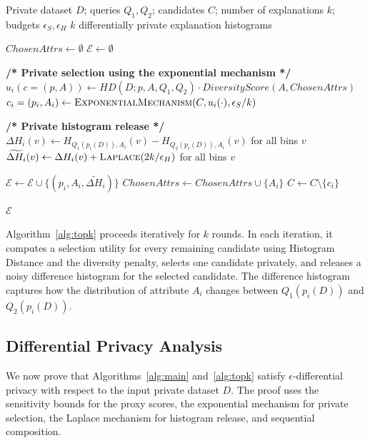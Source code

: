 \begin{algorithm}[t]
\caption{Find-Top-$k$-Explanations}
\label{alg:topk}
\begin{algorithmic}[1]
\Require Private dataset $D$; queries $Q_1,Q_2$; candidates $C$; number of explanations $k$; budgets $\epsilon_S,\epsilon_H$
\Ensure $k$ differentially private explanation histograms

\State $ChosenAttrs \gets \emptyset$
\State $\mathcal{E} \gets \emptyset$

  \State \textbf{/* Private selection using the exponential mechanism */}
  \State $u_i(c=(p,A)) \gets HD(D;p,A,Q_1,Q_2) \cdot DiversityScore(A,ChosenAttrs)$
  \State $c_i=(p_i,A_i) \gets \textsc{ExponentialMechanism}(C,u_i(\cdot),\epsilon_S/k)$

  \State \textbf{/* Private histogram release */}
  \State $\Delta H_i(v) \gets H_{Q_1(p_i(D)),A_i}(v)-H_{Q_2(p_i(D)),A_i}(v)$ for all bins $v$
  \State $\widetilde{\Delta H_i}(v) \gets \Delta H_i(v)+\textsc{Laplace}(2k/\epsilon_H)$ for all bins $v$

  \State $\mathcal{E} \gets \mathcal{E} \cup \{(p_i,A_i,\widetilde{\Delta H_i})\}$
  \State $ChosenAttrs \gets ChosenAttrs \cup \{A_i\}$
  \State $C \gets C \setminus \{c_i\}$
\EndFor

\State \Return $\mathcal{E}$
\end{algorithmic}
\end{algorithm}

Algorithm~\ref{alg:topk} proceeds iteratively for $k$ rounds.
In each iteration, it computes a selection utility for every remaining candidate using Histogram Distance and the diversity penalty, selects one candidate privately, and releases a noisy difference histogram for the selected candidate.
The difference histogram captures how the distribution of attribute $A_i$ changes between $Q_1(p_i(D))$ and $Q_2(p_i(D))$.

\subsection{Differential Privacy Analysis}
\label{subsec:dp-proof}

We now prove that Algorithms~\ref{alg:main} and~\ref{alg:topk} satisfy $\epsilon$-differential privacy with respect to the input private dataset $D$.
The proof uses the sensitivity bounds for the proxy scores, the exponential mechanism for private selection, the Laplace mechanism for histogram release, and sequential composition.


